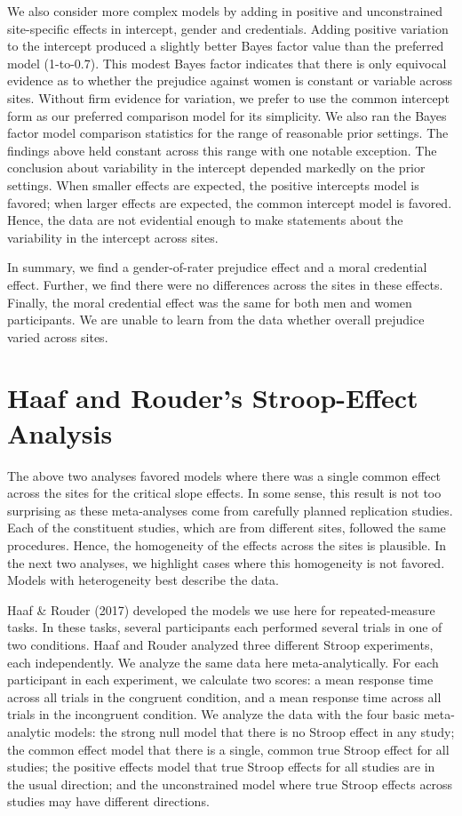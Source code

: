 \documentclass[english,man]{apa6}
\theoremstyle{definition}
\theoremstyle{definition}
\theoremstyle{remark}
\begin{document}
We also consider more complex models by adding in positive and
unconstrained site-specific effects in intercept, gender and
credentials. Adding positive variation to the intercept produced a
slightly better Bayes factor value than the preferred model (1-to-0.7).
This modest Bayes factor indicates that there is only equivocal evidence
as to whether the prejudice against women is constant or variable across
sites. Without firm evidence for variation, we prefer to use the common
intercept form as our preferred comparison model for its simplicity. We
also ran the Bayes factor model comparison statistics for the range of
reasonable prior settings. The findings above held constant across this
range with one notable exception. The conclusion about variability in
the intercept depended markedly on the prior settings. When smaller
effects are expected, the positive intercepts model is favored; when
larger effects are expected, the common intercept model is favored.
Hence, the data are not evidential enough to make statements about the
variability in the intercept across sites.

In summary, we find a gender-of-rater prejudice effect and a moral
credential effect. Further, we find there were no differences across the
sites in these effects. Finally, the moral credential effect was the
same for both men and women participants. We are unable to learn from
the data whether overall prejudice varied across sites.

\section{Haaf and Rouder's Stroop-Effect
Analysis}\label{haaf-and-rouders-stroop-effect-analysis}

The above two analyses favored models where there was a single common
effect across the sites for the critical slope effects. In some sense,
this result is not too surprising as these meta-analyses come from
carefully planned replication studies. Each of the constituent studies,
which are from different sites, followed the same procedures. Hence, the
homogeneity of the effects across the sites is plausible. In the next
two analyses, we highlight cases where this homogeneity is not favored.
Models with heterogeneity best describe the data.

Haaf \& Rouder (2017) developed the models we use here for
repeated-measure tasks. In these tasks, several participants each
performed several trials in one of two conditions. Haaf and Rouder
analyzed three different Stroop experiments, each independently. We
analyze the same data here meta-analytically. For each participant in
each experiment, we calculate two scores: a mean response time across
all trials in the congruent condition, and a mean response time across
all trials in the incongruent condition. We analyze the data with the
four basic meta-analytic models: the strong null model that there is no
Stroop effect in any study; the common effect model that there is a
single, common true Stroop effect for all studies; the positive effects
model that true Stroop effects for all studies are in the usual
direction; and the unconstrained model where true Stroop effects across
studies may have different directions.
\end{document}
